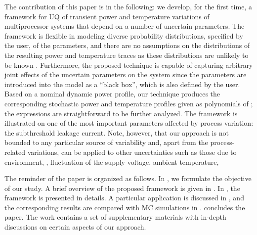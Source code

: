 The contribution of this paper is in the following: we develop, for the first time, a framework for UQ of transient power and temperature variations of multiprocessor systems that depend on a number of uncertain parameters. The framework is flexible in modeling diverse probability distributions, specified by the user, of the parameters, and there are no assumptions on the distributions of the resulting power and temperature traces as these distributions are unlikely to be known \apriori. Furthermore, the proposed technique is capable of capturing arbitrary joint effects of the uncertain parameters on the system since the parameters are introduced into the model as a ``black box'', which is also defined by the user. Based on a nominal dynamic power profile, our technique produces the corresponding stochastic power and temperature profiles given as polynomials of \rvs; the expressions are straightforward to be further analyzed. The framework is illustrated on one of the most important parameters affected by process variation: the subthreshold leakage current. Note, however, that our approach is not bounded to any particular source of variability and, apart from the process-related variations, can be applied to other uncertainties such as those due to environment, \ie, fluctuation of the supply voltage, ambient temperature, \etc

The reminder of the paper is organized as follows. In , we formulate the objective of our study. A brief overview of the proposed framework is given in . In , the framework is presented in details. A particular application is discussed in , and the corresponding results are compared with MC simulations in .  concludes the paper. The work contains a set of supplementary materials with in-depth discussions on certain aspects of our approach.
